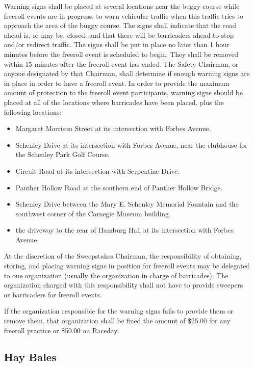 	Warning signs shall be placed at several locations near the buggy course while
	freeroll events are in progress, to warn vehicular traffic when this traffic
	tries to approach the area of the buggy course. The signs shall indicate that
	the road ahead is, or may be, closed, and that there will be barricaders ahead to
	stop and/or redirect traffic. The signs shall be put in place no later than 1 hour
	minutes before the freeroll event is scheduled to begin. They shall be
	removed within 15 minutes after the freeroll event has ended. The Safety
	Chairman, or anyone designated by that Chairman, shall determine if enough
	warning signs are in place in order to have a freeroll event. In order to
	provide the maximum amount of protection to the freeroll event participants,
	warning signs should be placed at all of the locations where barricades have
	been placed, plus the following locations:

	\begin{itemize}
		\item Margaret Morrison Street at its intersection with Forbes Avenue.
		\item Schenley Drive at its intersection with Forbes Avenue, near the clubhouse for the Schenley Park Golf Course.
		\item Circuit Road at its intersection with Serpentine Drive.
		\item Panther Hollow Road at the southern end of Panther Hollow Bridge.
		\item Schenley Drive between the Mary E. Schenley Memorial Fountain and the southwest corner of the Carnegie Museum building.
		\item the driveway to the rear of Hamburg Hall at its intersection with Forbes Avenue.
	\end{itemize}

	At the discretion of the Sweepstakes Chairman, the responsibility of obtaining,
	storing, and placing warning signs in position for freeroll events may be
	delegated to one organization (usually the organization in charge of
	barricades). The organization charged with this responsibility shall not have
	to provide sweepers or barricaders for freeroll events.

	If the organization responsible for the warning signs fails to provide them or
	remove them, that organization shall be fined the amount of \$25.00 for any
	freeroll practice or \$50.00 on Raceday.


\subsection{Hay Bales}
\label{subsec:Haybales}

